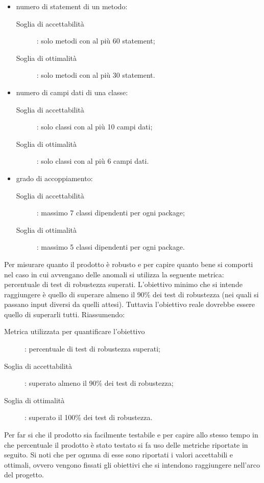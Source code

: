 					\begin{itemize}
						\item numero di statement di un metodo:
						\begin{description}
							\item[Soglia di accettabilità]: solo metodi con al più 60 statement;
							\item[Soglia di ottimalità]: solo metodi con al più 30 statement.
						\end{description}
						\item numero di campi dati di una classe:
						\begin{description}
							\item[Soglia di accettabilità]: solo classi con al più 10 campi dati;
							\item[Soglia di ottimalità]: solo classi con al più 6 campi dati.
						\end{description}
						\item grado di accoppiamento:
						\begin{description}
							\item[Soglia di accettabilità]: massimo 7 classi dipendenti per ogni package;
							\item[Soglia di ottimalità]: massimo 5 classi dipendenti per ogni package.
						\end{description}
					\end{itemize}					
					Per misurare quanto il prodotto è robusto e per capire quanto bene si comporti nel caso in cui avvengano delle anomali si utilizza la seguente metrica: percentuale di test di robustezza superati. L'obiettivo minimo che si intende raggiungere è quello di superare almeno il 90\% dei test di robustezza (nei quali si passano input diversi da quelli attesi). Tuttavia l'obiettivo reale dovrebbe essere quello di superarli tutti. Riassumendo:
					\begin{description}
						\item[Metrica utilizzata per quantificare l'obiettivo]: percentuale di test di robustezza superati;
						\item[Soglia di accettabilità]: superato almeno il 90\% dei test di robustezza;
						\item[Soglia di ottimalità]: superato il 100\% dei test di robustezza.
					\end{description}
					Per far si che il prodotto sia facilmente testabile e per capire allo stesso tempo in che percentuale il prodotto è stato testato si fa uso delle metriche riportate in seguito. Si noti che per ognuna di esse sono riportati i valori accettabili e ottimali, ovvero vengono fissati gli obiettivi che si intendono raggiungere nell'arco del progetto.
